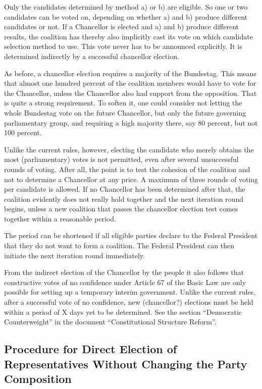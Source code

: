Only the candidates determined by method a) or b) are eligible.
So one or two
candidates can be voted on, depending on whether a) and b) produce different candidates or not.
If a Chancellor is elected and a) and b) produce different results, the coalition has thereby also implicitly cast its vote on
which candidate selection method to use.
This vote never has to be announced explicitly.
It is determined indirectly by a successful chancellor election.

As before, a chancellor election requires a majority of the Bundestag.
This means that almost one hundred percent of the coalition members would have to vote for the Chancellor, unless the Chancellor
also had support from the opposition.
That is quite a strong requirement.
To soften it, one could consider not letting the whole Bundestag
vote on the future Chancellor, but only the future governing parliamentary group, and requiring a high
majority there, say 80 percent, but not 100 percent.

Unlike the current rules, however, electing the candidate who merely obtains the most (parliamentary) votes is not permitted, even after
several unsuccessful rounds of voting.
After all, the point is to test the cohesion of the coalition and not to determine a Chancellor at any price.
A maximum of three rounds of voting per candidate is allowed.
If no Chancellor has been determined after that, the coalition evidently does not really hold together and the next iteration round begins,
unless a new coalition that passes the chancellor election test comes together within a reasonable period.

The period
can be shortened if all eligible parties declare to the Federal President that they do not want to form a coalition.
The Federal President can then initiate the next iteration round immediately.


From the indirect election of the Chancellor by the people it also follows that constructive votes of no confidence under Article 67 of the Basic Law
are only possible for setting up a temporary interim government. Unlike the current rules, after
a successful vote of no confidence, new (chancellor?) elections must be held within a period of X days yet to be determined.
See the section \enquote{Democratic Counterweight} in the document \enquote{Constitutional Structure Reform}.

\subsection{Procedure for Direct Election of Representatives Without Changing the Party Composition}

